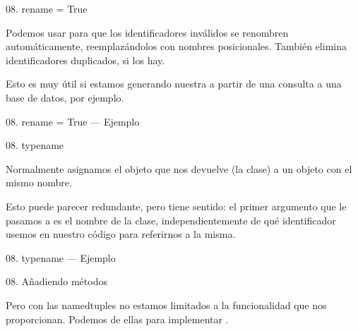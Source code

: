 \begin{frame}{08. rename = True}
  \begin{block}{}
    \centering
    Podemos usar  para que los
    identificadores inválidos se renombren automáticamente,
    reemplazándolos con nombres posicionales.  También elimina
    identificadores duplicados, si los hay.
  \end{block}

  \begin{center}
    \small
    Esto es muy útil si estamos generando nuestra
     a partir de una consulta a una base de
    datos, por ejemplo.
  \end{center}
\end{frame}

\begin{frame}{08. rename = True — Ejemplo}
  \footnotesize
\end{frame}

\begin{frame}{08. typename}
  \begin{alertblock}{}
    \centering
    Normalmente asignamos el objeto que  nos
    devuelve (la clase) a un objeto con el mismo nombre.
  \end{alertblock}

  \begin{center}
    \small
    Esto puede parecer redundante, pero tiene sentido: el primer
    argumento que le pasamos a  es el nombre
    de la clase, independientemente de qué identificador usemos en
    nuestro código para referirnos a la misma.
  \end{center}
\end{frame}

\begin{frame}{08. typename — Ejemplo}
  \footnotesize
\end{frame}

\begin{frame}{08. Añadiendo métodos}
  \begin{alertblock}{}
    \centering
    Pero con las namedtuples no estamos limitados a la funcionalidad
    que nos proporcionan. Podemos  de ellas para
    implementar .
  \end{alertblock}
\end{frame}

